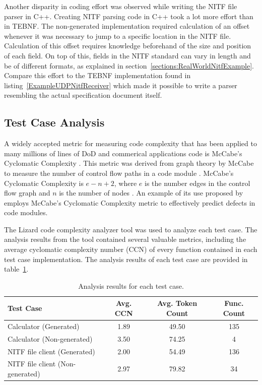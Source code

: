 \indent
Another disparity in coding effort was observed while writing the NITF file parser in C++.  Creating NITF parsing code in C++ took a lot more effort than in TEBNF.  The non-generated implementation required calculation of an offset whenever it was necessary to jump to a specific location in the NITF file.  Calculation of this offset requires knowledge beforehand of the size and position of each field.  On top of this, fields in the NITF standard can vary in length and be of different formats, as explained in section~\ref{sections:RealWorldNitfExample}.  Compare this effort to the TEBNF implementation found in listing~\ref{ExampleUDPNitfReceiver} which made it possible to write a parser resembling the actual specification document itself.

\subsection{Test Case Analysis}
A widely accepted metric for measuring code complexity that has been applied to many millions of lines of  DoD and commerical applications code is McCabe's Cyclomatic Complexity \cite{cardoso_01}.  This metric was derived from graph theory by McCabe to measure the number of control flow paths in a code module \cite{cardoso_01}.  McCabe's Cyclomatic Complexity is $ e - n + 2 $, where $e$ is the number edges in the control flow graph and $n$ is the number of nodes \cite{cardoso_01}.  An example of its use proposed by \cite{zhang_01} employs McCabe's Cyclomatic Complexity metric to effectively predict defects in code modules.

\indent
The Lizard code complexity analyzer \cite{lizard_01} tool was used to analyze each test case.  The analysis results from the tool contained several valuable metrics, including the average cyclomatic complexity number (CCN) \cite{lizard_01} of every function contained in each test case implementation.  The analysis results of each test case are provided in table~\ref{LizardAnalysis}.

\begin{table}[h]
\begin{center}
\caption{Analysis results for each test case.}
\label{LizardAnalysis}
\begin{tabular}{|l|c|c|c|} \hline
\textbf{Test Case} & \textbf{Avg. CCN} & \textbf{Avg. Token Count} & \textbf{Func. Count} \\ \hline \hline
Calculator (Generated) & 1.89 & 49.50 & 135 \\ \hline
Calculator (Non-generated) & 3.50 & 74.25 & 4 \\ \hline
NITF file client (Generated) & 2.00 & 54.49 & 136  \\ \hline
NITF file client (Non-generated) & 2.97 & 79.82 & 34 \\ \hline
\end{tabular}
\end{center}
\end{table}

